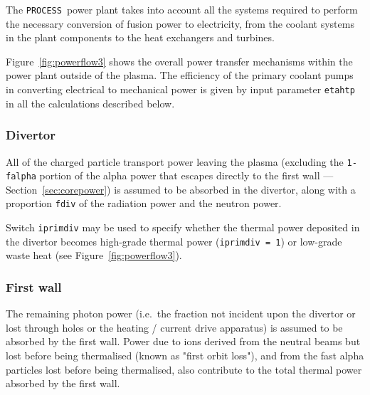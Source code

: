 \documentclass[11pt,a4paper]{report}
\newcommand{\process}{\mbox{\texttt{PROCESS}}}
\begin{document}
The \process\ power plant takes into account all the systems required to
perform the necessary conversion of fusion power to electricity, from the
coolant systems in the plant components to the heat exchangers and turbines.

Figure~\ref{fig:powerflow3} shows the overall power transfer mechanisms within the power plant outside of the plasma.  The efficiency of the primary coolant pumps in converting electrical to mechanical power is given by input parameter \texttt{etahtp} in all the calculations described below.


\subsubsection{Divertor}
\label{sec:divpower}

All of the charged particle transport power leaving the plasma (excluding the
\texttt{1-falpha} portion of the alpha power that escapes directly to the first
wall --- Section~\ref{sec:corepower}) is assumed to be absorbed in the
divertor, along with a proportion \texttt{fdiv} of the radiation power and the
neutron power. 

Switch \texttt{iprimdiv} may be used to specify whether the thermal power
deposited in the divertor becomes high-grade thermal power
(\texttt{iprimdiv = 1}) or low-grade waste heat (see
Figure~\ref{fig:powerflow3}). 

\subsubsection{First wall}

The remaining photon power (i.e.\ the fraction not incident upon the divertor or lost through holes or the heating / current drive apparatus) is assumed to be absorbed by the first wall. Power due to ions derived from the neutral beams but lost before being thermalised (known as "first orbit loss"), and from the fast alpha particles lost before being thermalised, also contribute to the total thermal power absorbed by the first wall.
\end{document}
